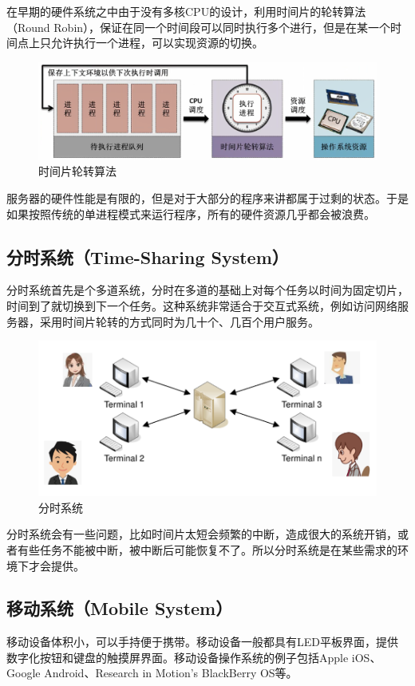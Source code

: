 在早期的硬件系统之中由于没有多核CPU的设计，利用时间片的轮转算法（Round Robin），保证在同一个时间段可以同时执行多个进行，但是在某一个时间点上只允许执行一个进程，可以实现资源的切换。

\begin{figure}[H]
	\centering
	\includegraphics[scale=0.6]{img/C1/1-6/5.png}
	\caption{时间片轮转算法}
\end{figure}

服务器的硬件性能是有限的，但是对于大部分的程序来讲都属于过剩的状态。于是如果按照传统的单进程模式来运行程序，所有的硬件资源几乎都会被浪费。\\

\subsection{分时系统（Time-Sharing System）}

分时系统首先是个多道系统，分时在多道的基础上对每个任务以时间为固定切片，时间到了就切换到下一个任务。这种系统非常适合于交互式系统，例如访问网络服务器，采用时间片轮转的方式同时为几十个、几百个用户服务。

\begin{figure}[H]
	\centering
	\includegraphics[scale=0.55]{img/C1/1-6/6.png}
	\caption{分时系统}
\end{figure}

分时系统会有一些问题，比如时间片太短会频繁的中断，造成很大的系统开销，或者有些任务不能被中断，被中断后可能恢复不了。所以分时系统是在某些需求的环境下才会提供。\\

\subsection{移动系统（Mobile System）}

移动设备体积小，可以手持便于携带。移动设备一般都具有LED平板界面，提供数字化按钮和键盘的触摸屏界面。移动设备操作系统的例子包括Apple iOS、Google Android、Research in Motion's BlackBerry OS等。

\newpage